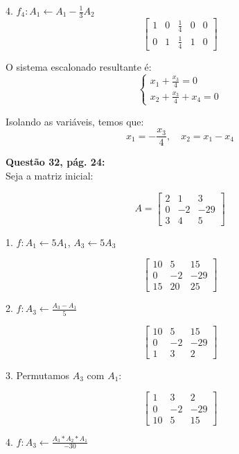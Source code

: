 \documentclass[a4paper,12pt]{article}
\begin{document}
4. \( f_4: A_1 \leftarrow A_1 - \frac{1}{3}A_2 \)
\[
\begin{bmatrix}
1 & 0 & \frac{1}{4} & 0 & 0 \\
0 & 1 & \frac{1}{4} & 1 & 0
\end{bmatrix}
\]

O sistema escalonado resultante é:
\[
\begin{cases}
x_1 + \frac{x_3}{4} = 0 \\
x_2 + \frac{x_3}{4} + x_4 = 0
\end{cases}
\]

Isolando as variáveis, temos que:
\[
x_1 = -\frac{x_3}{4}, \quad x_2 = x_1 - x_4
\]


\textbf{Questão 32, pág. 24:}\\


Seja a matriz inicial:

\[
A =
\begin{bmatrix}
2 & 1 & 3 \\
0 & -2 & -29 \\
3 & 4 & 5
\end{bmatrix}
\]

1. \( f: A_1 \leftarrow 5A_1 \), \( A_3 \leftarrow 5A_3 \)

\[
\begin{bmatrix}
10 & 5 & 15 \\
0 & -2 & -29 \\
15 & 20 & 25
\end{bmatrix}
\]

2. \( f: A_3 \leftarrow \frac{A_3 - A_1}{5} \)

\[
\begin{bmatrix}
10 & 5 & 15 \\
0 & -2 & -29 \\
1 & 3 & 2
\end{bmatrix}
\]

3. Permutamos \( A_3 \) com \( A_1 \):

\[
\begin{bmatrix}
1 & 3 & 2 \\
0 & -2 & -29 \\
10 & 5 & 15
\end{bmatrix}
\]

4. \( f: A_3 \leftarrow \frac{A_3 * A_2 * A_1}{-30} \)
\end{document}
